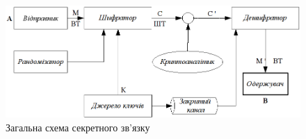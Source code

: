 \begin{figure}
    \centering\includegraphics[width=5.0in]{crypt-img/crypt-img4.png}
    \caption{Загальна схема секретного зв'язку}\label{img:secretConnection}
\end{figure}
